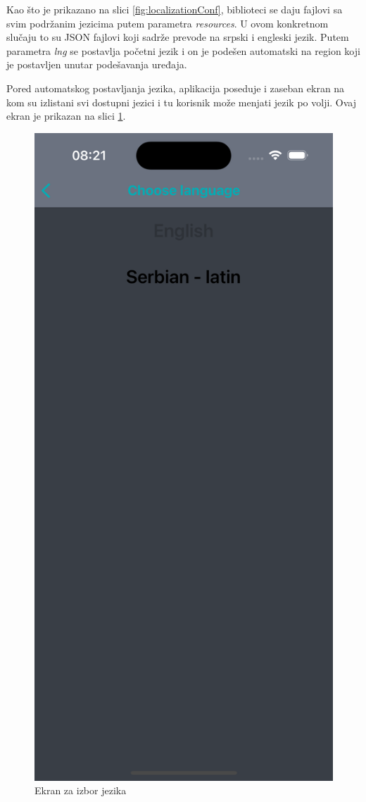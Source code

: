 \documentclass[12pt,oneside]{memoir}
\begin{document}
Kao što je prikazano na slici \ref{fig:localizationConf}, biblioteci se daju fajlovi sa svim podržanim jezicima putem parametra \textit{resources}. U ovom konkretnom slučaju to su JSON fajlovi koji sadrže prevode na srpski i engleski jezik. Putem parametra \textit{lng} se postavlja početni jezik i on je podešen automatski na region koji je postavljen unutar podešavanja uređaja.

Pored automatskog postavljanja jezika, aplikacija poseduje i zaseban ekran na kom su izlistani svi dostupni jezici i tu korisnik može menjati jezik po volji. Ovaj ekran je prikazan na slici \ref{fig:langScreen}.

\begin{figure}[h]
    \centering
    \includegraphics[scale=0.15]{docs/images/chapterFour/languages.png}
    \caption{Ekran za izbor jezika}
    \label{fig:langScreen}
\end{figure}
\end{document}

